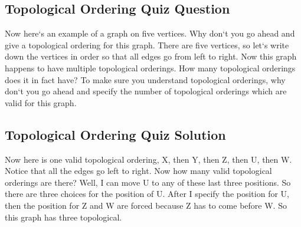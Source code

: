 \subsection{Topological Ordering Quiz Question}
Now here`s an example of a graph on five vertices.
Why don`t you go ahead and give a topological ordering for this graph.
There are five vertices, so let`s write down the vertices in order so that all edges go from left to right.
Now this graph happens to have multiple topological orderings.
How many topological orderings does it in fact have? To make sure you understand topological orderings, why don`t you go ahead and specify the number of topological orderings which are valid for this graph.

\subsection{Topological Ordering Quiz Solution}
Now here is one valid topological ordering, X, then Y, then Z, then U, then W\@.
Notice that all the edges go left to right.
Now how many valid topological orderings are there? Well, I can move U to any of these last three positions.
So there are three choices for the position of U\@.
After I specify the position for U, then the position for Z and W are forced because Z has to come before W\@.
So this graph has three topological.

